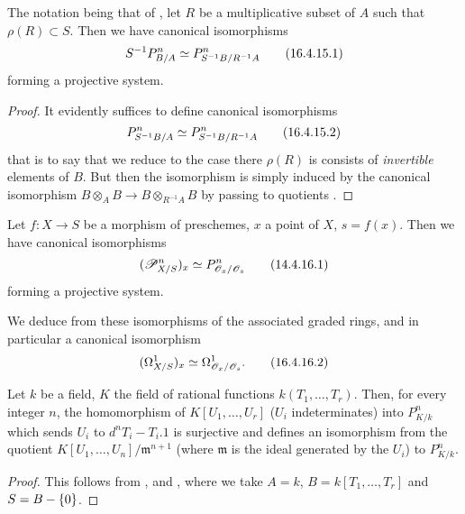 \begin{corollary}[16.4.15]
\label{IV.16.4.15}
The notation being that of , let $R$ be a multiplicative subset of $A$ such that $\rho(R) \subset S$.
Then we have canonical isomorphisms 
\[
  \label{IV.16.4.15.1}
  S^{-1}P_{B/A}^n \simeq P_{S^{-1}B/R^{-1}A}^n
  \tag{16.4.15.1}
\]
forming a projective system.
\end{corollary}

\begin{proof}
It evidently suffices to define canonical isomorphisms 
\[
  \label{IV.16.4.15.2}
  P_{S^{-1}B/A}^n \simeq P_{S^{-1}B/R^{-1}A}^n
  \tag{16.4.15.2}
\]
that is to say that we reduce to the case there $\rho(R)$ is consists of \emph{invertible} elements of $B$.
But then the isomorphism  is simply induced by the canonical isomorphism $B \otimes_A B \to B \otimes_{R^{-1}A} B$ by passing to quotients .
\end{proof}

\begin{corollary}[16.4.16]
\label{IV.16.4.16}
Let $f:X \to S$ be a morphism of preschemes, $x$ a point of $X$, $s = f(x)$.
Then we have canonical isomorphisms
\[
  \label{IV.14.4.16.1}
  (\mathscr{P}_{X/S}^n)_x \simeq P_{\mathscr{O}_x/\mathscr{O}_s}^n
  \tag{14.4.16.1}
\]
forming a projective system.
\end{corollary}

We deduce from these isomorphisms of the associated graded rings, and in particular a canonical isomorphism
\[
  \label{IV.16.4.16.2}
  (\Omega_{X/S}^1)_x \simeq \Omega_{\mathscr{O}_x/\mathscr{O}_s}^1.
  \tag{16.4.16.2}
\]

\begin{corollary}[16.4.17]
\label{IV.16.4.17}
Let $k$ be a field, $K$ the field of rational functions $k(T_1, \dots, T_r)$.
Then, for every integer $n$, the homomorphism of $K[U_1, \dots, U_r]$ ($U_i$ indeterminates) into $P_{K/k}^n$ which sends $U_i$ to $d^nT_i - T_i.1$ is surjective and defines an isomorphism from the quotient $K[U_1, \dots, U_n]/\mathfrak{m}^{n+1}$  (where $\mathfrak{m}$ is the ideal generated by the $U_i$) to $P_{K/k}^n$.
\end{corollary}

\begin{proof}
This follows from ,   and , where we take $A = k$, $B = k[T_1, \dots, T_r]$ and $S = B - \{0\}$.
\end{proof}

